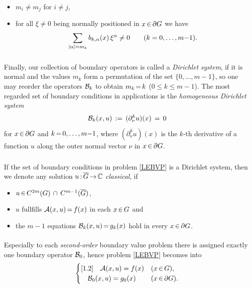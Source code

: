 \documentclass[11pt,twoside]{article}
\begin{document}
\begin{itemize}[leftmargin=15mm,itemsep=2pt]
\item[(B-1)]
$m_i \neq m_j$ for $i \neq j$,

\item[(B-2)]
for all $\xi \neq 0$ being normally positioned in $x {\,\in\,} \partial G$
we have
\[
\sum_{\abs{\alpha} = m_k} b_{k,\alpha}(x) \, \xi^{\alpha} \neq 0
\quad \quad (k=0,\ldots,m{-}1).
\]
\end{itemize}

\subparagraph{} %
Finally,
our collection of boundary operators is called a \textit{Dirichlet system},
if it is normal and the values $m_k$ form a permutation
of the set $\{0,\ldots,m{-}1\}$,
so one may reorder the operators ${\mathcal{B}}_k$ to obtain $m_k {\,=\,} k$
($0 \leq k \leq m{-}1$).
The most regarded set of boundary conditions in applications
is the \textit{homogeneous Dirichlet system}
\begin{equation}\label{HOMOGENEOUS_DIRICHLET_SYSTEM}
{\mathcal{B}}_k(x,u) \,:=\, (\partial_{\nu}^k u)(x) \,=\, 0
\end{equation}
for $x {\,\in\,} \partial G$ and $k {\,=\,} 0,\ldots,m{-}1$,
where $(\partial_{\nu}^k u)(x)$ is the $k$-th derivative of a function $u$
along the outer normal vector $\nu$ in $x {\,\in\,} \partial G$.

\subparagraph{} %
If the set of boundary conditions in problem \eqref{LEBVP} is a Dirichlet system,
then we denote any solution $u {\,:\,} \overline{G} {\,\to\,} {\mathbb{C}}$ \textit{classical},
if
\begin{itemize}[leftmargin=9mm]
\item[(a)] $u {\,\in\,} C^{2m}(G) \, \cap \, C^{m-1}(\overline{G})$,
\item[(b)] $u$ fullfills ${\mathcal{A}}(x,u) {\,=\,} f(x)$ in each $x {\,\in\,} G$ and
\item[(c)] the $m{-}1$ equations ${\mathcal{B}}_k(x,u) {\,=\,} g_k(x)$ hold
           in every $x {\,\in\,} \partial G$.
\end{itemize}

\paragraph{} %
Especially to each \textit{second-order} boundary value problem
there is assigned exactly one boundary operator ${\mathcal{B}}_0$,
hence problem \eqref{LEBVP} becomes into
\begin{equation}\label{SECOND_ORDER_BOUNDARY_VALUE_PROBLEM}
\begin{cases}[1.2]
\quad {\mathcal{A}}(x,u)     = f(x)   & (x {\,\in\,} G),\\
\quad {\mathcal{B}}_0(x,u) = g_0(x) & (x {\,\in\,} \partial G).\\
\end{cases}
\end{equation}
\end{document}
